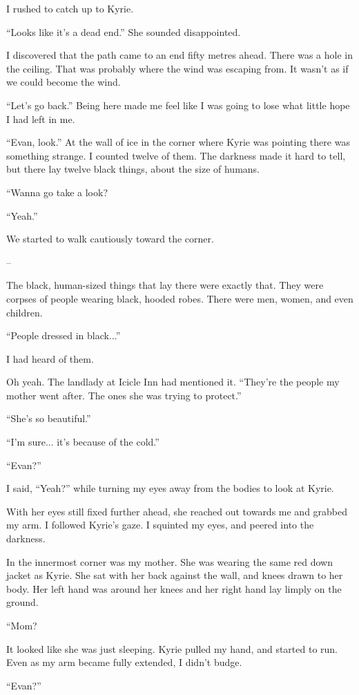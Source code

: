 \documentclass[oneside]{book}
\begin{document}
I rushed to catch up to Kyrie.

“Looks like it’s a dead end.” She sounded disappointed.

I discovered that the path came to an end fifty metres ahead. There was a hole in the ceiling. That was probably where the wind was escaping from. It wasn’t as if we could become the wind.

“Let’s go back.” Being here made me feel like I was going to lose what little hope I had left in me.

“Evan, look.” At the wall of ice in the corner where Kyrie was pointing there was something strange. I counted twelve of them. The darkness made it hard to tell, but there lay twelve black things, about the size of humans.

“Wanna go take a look?

“Yeah.”

We started to walk cautiously toward the corner.

–

The black, human-sized things that lay there were exactly that. They were corpses of people wearing black, hooded robes. There were men, women, and even children.

“People dressed in black...”

I had heard of them.

Oh yeah. The landlady at Icicle Inn had mentioned it. “They’re the people my mother went after. The ones she was trying to protect.”

“She’s so beautiful.”

“I’m sure... it’s because of the cold.”

“Evan?”

I said, “Yeah?” while turning my eyes away from the bodies to look at Kyrie.

With her eyes still fixed further ahead, she reached out towards me and grabbed my arm. I followed Kyrie’s gaze. I squinted my eyes, and peered into the darkness.

In the innermost corner was my mother. She was wearing the same red down jacket as Kyrie. She sat with her back against the wall, and knees drawn to her body. Her left hand was around her knees and her right hand lay limply on the ground.

“Mom?

It looked like she was just sleeping. Kyrie pulled my hand, and started to run. Even as my arm became fully extended, I didn’t budge.

“Evan?”
\end{document}
